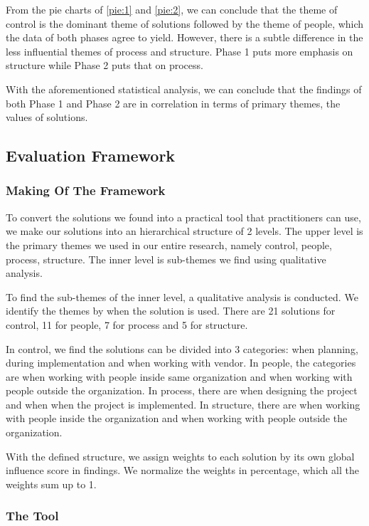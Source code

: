From the pie charts of \ref{pie:1} and \ref{pie:2}, we can conclude that the theme of control is the dominant theme of solutions followed by the theme of people, which the data of both phases agree to yield. However, there is a subtle difference in the less influential themes of process and structure. Phase 1 puts more emphasis on structure while Phase 2 puts that on process.

With the aforementioned statistical analysis, we can conclude that the findings of both Phase 1 and Phase 2 are in correlation in terms of primary themes, the values of solutions.

\subsection{Evaluation Framework}

\subsubsection{Making Of The Framework}
To convert the solutions we found into a practical tool that practitioners can use, we make our solutions into an hierarchical structure of 2 levels. The upper level is the primary themes we used in our entire research, namely control, people, process, structure. The inner level is sub-themes we find using qualitative analysis.

To find the sub-themes of the inner level, a qualitative analysis is conducted. We identify the themes by when the solution is used. There are 21 solutions for control, 11 for people, 7 for process and 5 for structure.

In control, we find the solutions can be divided into 3 categories: when planning, during implementation and when working with vendor. In people, the categories are when working with people inside same organization and when working with people outside the organization. In process, there are when designing the project and when when the project is implemented. In structure, there are when working with people inside the organization and when working with people outside the organization.

With the defined structure, we assign weights to each solution by its own global influence score in findings. We normalize the weights in percentage, which all the weights sum up to 1.

\subsubsection{The Tool}

